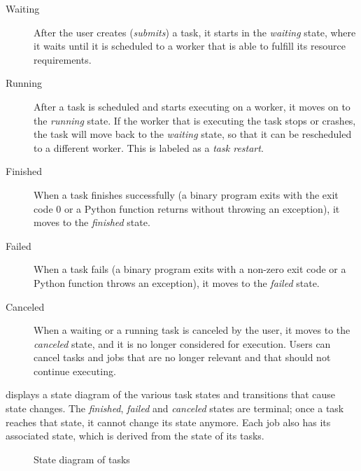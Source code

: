\begin{description}
	\item[Waiting] After the user creates (\emph{submits}) a task, it starts in the \emph{waiting}
		state, where it waits until it is scheduled to a worker that is able to fulfill its resource
		requirements.
	\item[Running] After a task is scheduled and starts executing on a worker, it moves on to the
		\emph{running} state. If the worker that is executing the task stops or crashes, the task
		will move back to the \emph{waiting} state, so that it can be rescheduled to a different
		worker. This is labeled as a \emph{task restart}.
	\item[Finished] When a task finishes successfully (a binary program exits with the exit code $0$
		or a Python function returns without throwing an exception), it moves to the \emph{finished}
		state.
	\item[Failed] When a task fails (a binary program exits with a non-zero exit code or a Python function throws an
		exception), it moves to the \emph{failed} state.
	\item[Canceled] When a waiting or a running task is canceled by the user, it moves to the \emph{canceled}
		state, and it is no longer considered for execution. Users can cancel tasks and jobs that are no
		longer relevant and that should not continue executing.
\end{description}

 displays a state diagram of the various task states and
transitions that cause state changes. The \emph{finished}, \emph{failed} and
\emph{canceled} states are terminal; once a task reaches that state, it cannot change its
state anymore. Each job also has its associated state, which is derived from the state of its
tasks.

\begin{figure}[h]
	\centering
	\caption{State diagram of \hyperqueue{} tasks}
	\label{fig:hq-task-state-diagram}
\end{figure}

